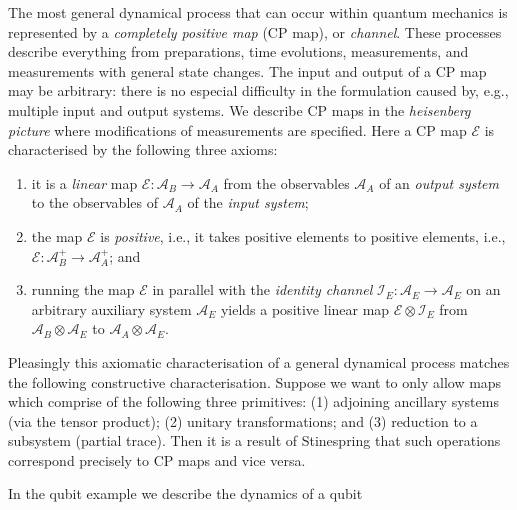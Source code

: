 \documentclass[11pt]{amsart}
\theoremstyle{plain}%
\theoremstyle{definition}
\theoremstyle{remark}
\begin{document}
The most general dynamical process that can occur within quantum mechanics is represented by a \emph{completely positive map} (CP map), or \emph{channel}. These processes describe everything from preparations, time evolutions, measurements, and measurements with general state changes. The input and output of a CP map may be arbitrary: there is no especial difficulty in the formulation caused by, e.g., multiple input and output systems. We describe CP maps in the \emph{heisenberg picture} where modifications of measurements are specified. Here a CP map $\mathcal{E}$ is characterised by the following three axioms: 
\begin{enumerate}
	\item it is a \emph{linear} map $\mathcal{E}:\mathcal{A}_B\rightarrow \mathcal{A}_A$ from the observables $\mathcal{A}_A$ of an \emph{output system} to the observables of $\mathcal{A}_A$ of the  \emph{input system};
	\item the map $\mathcal{E}$ is \emph{positive}, i.e., it takes positive elements to positive elements, i.e., $\mathcal{E}:\mathcal{A}_B^+\rightarrow \mathcal{A}_A^+$; and 
	\item running the map $\mathcal{E}$ in parallel with the \emph{identity channel} $\mathcal{I}_E : \mathcal{A}_E\rightarrow \mathcal{A}_E$ on an arbitrary auxiliary system $\mathcal{A}_E$ yields a positive linear map $\mathcal{E}\otimes \mathcal{I}_E$ from $\mathcal{A}_B\otimes \mathcal{A}_E$ to $\mathcal{A}_A\otimes \mathcal{A}_E$.
\end{enumerate} 
Pleasingly this axiomatic characterisation of a general dynamical process matches the following constructive characterisation. Suppose we want to only allow maps which comprise of the following three primitives: (1) adjoining ancillary systems (via the tensor product); (2) unitary transformations; and (3) reduction to a subsystem (partial trace). Then it is a result of Stinespring that such operations correspond precisely to CP maps and vice versa. 

In the qubit example we describe the dynamics of a qubit 
\end{document}
